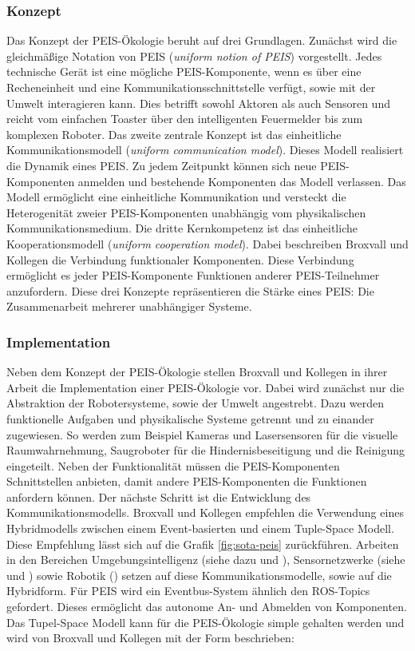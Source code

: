 \subsubsection{Konzept}
Das Konzept der PEIS-Ökologie beruht auf drei Grundlagen. Zunächst wird die gleichmäßige Notation von PEIS (\textit{uniform notion of PEIS}) vorgestellt. Jedes technische Gerät ist eine mögliche PEIS-Komponente, wenn es über eine Recheneinheit und eine Kommunikationsschnittstelle verfügt, sowie mit der Umwelt interagieren kann. Dies betrifft sowohl Aktoren als auch Sensoren und reicht vom einfachen Toaster über den intelligenten Feuermelder bis zum komplexen Roboter. Das zweite zentrale Konzept ist das einheitliche Kommunikationsmodell (\textit{uniform communication model}). Dieses Modell realisiert die Dynamik eines PEIS. Zu jedem Zeitpunkt können sich neue PEIS-Komponenten anmelden und bestehende Komponenten das Modell verlassen. Das Modell \glqq ermöglicht eine einheitliche Kommunikation und versteckt die Heterogenität zweier PEIS-Komponenten unabhängig vom physikalischen Kommunikationsmedium.\grqq \cite{Saffiotti:2005:PEA:1107548.1107615} Die dritte Kernkompetenz ist das einheitliche Kooperationsmodell (\textit{uniform cooperation model}). Dabei beschreiben Broxvall und Kollegen die Verbindung funktionaler Komponenten. Diese Verbindung ermöglicht es jeder PEIS-Komponente Funktionen anderer PEIS-Teilnehmer anzufordern. Diese drei Konzepte repräsentieren die Stärke eines PEIS: Die Zusammenarbeit mehrerer unabhängiger Systeme. \cite{Saffiotti:2005:PEA:1107548.1107615}

\subsubsection{Implementation}
Neben dem Konzept der PEIS-Ökologie stellen Broxvall und Kollegen in ihrer Arbeit die Implementation einer PEIS-Ökologie vor. Dabei wird zunächst nur die Abstraktion der Robotersysteme, sowie der Umwelt angestrebt. Dazu werden funktionelle Aufgaben und physikalische Systeme getrennt und zu einander zugewiesen. So werden zum Beispiel Kameras und Lasersensoren für die visuelle Raumwahrnehmung, Saugroboter für die Hindernisbeseitigung und die Reinigung eingeteilt. Neben der Funktionalität müssen die PEIS-Komponenten Schnittstellen anbieten, damit andere PEIS-Komponenten die Funktionen anfordern können. Der nächste Schritt ist die Entwicklung des Kommunikationsmodells. Broxvall und Kollegen empfehlen die Verwendung eines Hybridmodells zwischen einem Event-basierten und einem Tuple-Space Modell. Diese Empfehlung lässt sich auf die Grafik \ref{fig:sota-peis} zurückführen. Arbeiten in den Bereichen Umgebungsintelligenz (siehe dazu \cite{arregui2003stitch} und \cite{siegemund2004context}), Sensornetzwerke (siehe \cite{adjie1999design} und \cite{heidemann2001building}) sowie Robotik (\cite{caceres2003real}) setzen auf diese Kommunikationsmodelle, sowie auf die Hybridform. Für PEIS wird ein Eventbus-System ähnlich den ROS-Topics gefordert. Dieses ermöglicht das autonome An- und Abmelden von Komponenten. Das Tupel-Space Modell kann für die PEIS-Ökologie simple gehalten werden und wird von Broxvall und Kollegen mit der Form beschrieben:

